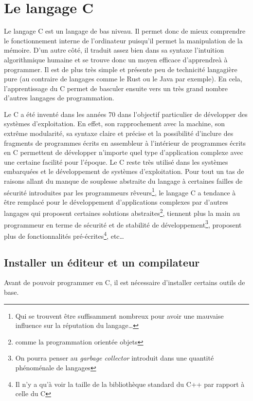 \documentclass[../../main.tex]{subfiles}
\begin{document}
\section{Le langage C}
Le langage C est un langage de bas niveau. Il permet donc de mieux comprendre le fonctionnement interne de l'ordinateur puisqu'il permet la manipulation de la mémoire. D'un autre côté, il traduit assez bien dans sa syntaxe l'intuition algorithmique humaine et se trouve donc un moyen efficace d'apprendreà à programmer. Il est de plus très simple et présente peu de technicité langagière pure (au contraire de langages comme le Rust ou le Java par exemple). En cela, l'apprentissage du C permet de basculer ensuite vers un très grand nombre d'autres langages de programmation.

Le C a été inventé dans les années 70 dans l'objectif particulier de développer des systèmes d'exploitation. En effet, son rapprochement avec la machine, son extrême modularité, sa syntaxe claire et précise et la possibilité d'inclure des fragments de programmes écrits en assembleur à l'intérieur de programmes écrits en C permettent de développer n'importe quel type d'application complexe avec une certaine facilité pour l'époque. Le C reste très utilisé dans les systèmes embarquées et le développement de systèmes d'exploitation. Pour tout un tas de raisons allant du manque de souplesse abstraite du langage à certaines failles de sécurité introduites par les programmeurs rêveurs\footnote{Qui se trouvent être suffisamment nombreux pour avoir une mauvaise influence sur la réputation du langage\dots}, le langage C a tendance à être remplacé pour le développement d'applications complexes par d'autres langages qui proposent certaines solutions abstraites\footnote{comme la programmation orientée objets}, tiennent plus la main au programmeur en terme de sécurité et de stabilité de développement\footnote{On pourra penser au \textit{garbage collector} introduit dans une quantité phénoménale de langages}, proposent plus de fonctionnalités pré-écrites\footnote{Il n'y a qu'à voir la taille de la bibliothèque standard du C++ par rapport à celle du C}, etc\dots
\subsection{Installer un éditeur et un compilateur}
Avant de pouvoir programmer en C, il est nécessaire d'installer certains outils de base.
\end{document}
